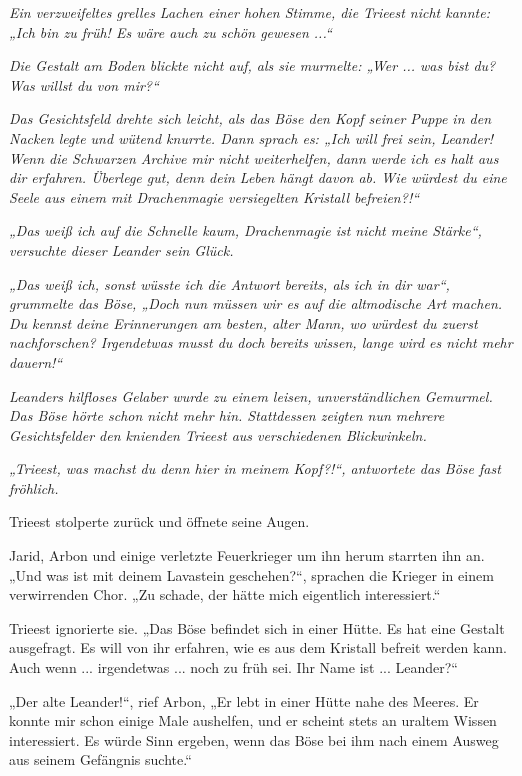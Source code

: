 \textit{Ein verzweifeltes grelles Lachen einer hohen Stimme, die Trieest nicht kannte: „Ich bin zu früh! Es wäre auch zu schön gewesen ...“}

\textit{Die Gestalt am Boden blickte nicht auf, als sie murmelte: „Wer ... was bist du? Was willst du von mir?“}

\textit{Das Gesichtsfeld drehte sich leicht, als das Böse den Kopf seiner Puppe in den Nacken legte und wütend knurrte. Dann sprach es: „Ich will frei sein, Leander! Wenn die Schwarzen Archive mir nicht weiterhelfen, dann werde ich es halt aus dir erfahren. Überlege gut, denn dein Leben hängt davon ab. Wie würdest du eine Seele aus einem mit Drachenmagie versiegelten Kristall befreien?!“}

\textit{„Das weiß ich auf die Schnelle kaum, Drachenmagie ist nicht meine Stärke“, versuchte dieser Leander sein Glück.}

\textit{„Das weiß ich, sonst wüsste ich die Antwort bereits, als ich in dir war“, grummelte das Böse, „Doch nun müssen wir es auf die altmodische Art machen. Du kennst deine Erinnerungen am besten, alter Mann, wo würdest du zuerst nachforschen? Irgendetwas musst du doch bereits wissen, lange wird es nicht mehr dauern!“}

\textit{Leanders hilfloses Gelaber wurde zu einem leisen, unverständlichen Gemurmel. Das Böse hörte schon nicht mehr hin. Stattdessen zeigten nun mehrere Gesichtsfelder den knienden Trieest aus verschiedenen Blickwinkeln.}

\textit{„Trieest, was machst du denn hier in meinem Kopf?!“, antwortete das Böse fast fröhlich.}



\trennzeichen



Trieest stolperte zurück und öffnete seine Augen.

Jarid, Arbon und einige verletzte Feuerkrieger um ihn herum starrten ihn an. „Und was ist mit deinem Lavastein geschehen?“, sprachen die Krieger in einem verwirrenden Chor. „Zu schade, der hätte mich eigentlich interessiert.“

Trieest ignorierte sie. „Das Böse befindet sich in einer Hütte. Es hat eine Gestalt ausgefragt. Es will von ihr erfahren, wie es aus dem Kristall befreit werden kann. Auch wenn ... irgendetwas ... noch zu früh sei. Ihr Name ist ... Leander?“

„Der alte Leander!“, rief Arbon, „Er lebt in einer Hütte nahe des Meeres. Er konnte mir schon einige Male aushelfen, und er scheint stets an uraltem Wissen interessiert. Es würde Sinn ergeben, wenn das Böse bei ihm nach einem Ausweg aus seinem Gefängnis suchte.“

